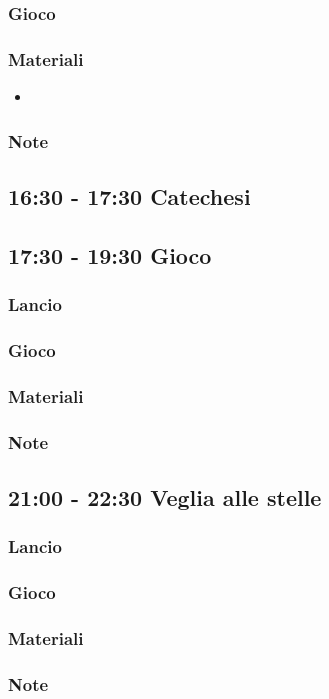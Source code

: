 \documentclass[../main.tex]{subfiles}
\begin{document}
        \subsubsection{Gioco}

        \subsubsection{Materiali}
        \begin{itemize}
        \item
        \end{itemize}
       \subsubsection{Note}
    \subsection{16:30 - 17:30 Catechesi}   
    \subsection{17:30 - 19:30 Gioco}
        \subsubsection{Lancio}
        \subsubsection{Gioco}
        \subsubsection{Materiali}
        \subsubsection{Note}
        
    \subsection{21:00 - 22:30 Veglia alle stelle}
        \subsubsection{Lancio}
        \subsubsection{Gioco}
        \subsubsection{Materiali}
        \subsubsection{Note}
   
\end{document}
